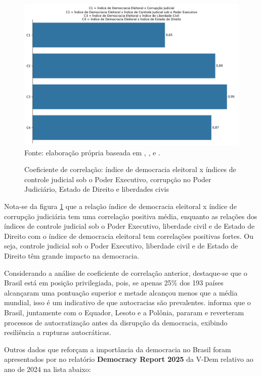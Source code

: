 \begin{figure}[H]
	\centering
	\caption{Coeficiente de correlação: índice de democracia eleitoral x índices de controle judicial sob o Poder Executivo, corrupção no Poder Judiciário, Estado de Direito e liberdades civis}
	\includegraphics[width=1\linewidth]{figuras/comparacao_democracia.png}
	\label{fig:comparacao_democracia}
	\footnotesize{Fonte: elaboração própria baseada em \cite{rule-of-law-index}, \cite{jus_constraints_on_gov}, \cite{judicial-corruption-score} e \cite{human-rights-index-vdem}.}
\end{figure}

Nota-se da figura \ref{fig:comparacao_democracia} que a relação índice de democracia eleitoral x índice de corrupção judiciária tem uma correlação positiva média, enquanto as relações dos índices de controle judicial sob o Poder Executivo, liberdade civil e de Estado de Direito com o índice de democracia eleitoral tem correlações positivas fortes. Ou seja, controle judicial sob o Poder Executivo, liberdade civil e de Estado de Direito têm grande impacto na democracia. 

Considerando a análise de coeficiente de correlação anterior, destaque-se que o Brasil está em posição privilegiada, pois, se apenas 25\% dos 193 países alcançaram uma pontuação superior e metade alcançou menos que a média mundial, isso é um indicativo de que autocracias são prevalentes. \cite{nord2025democracy} informa que o Brasil, juntamente com o Equador, Lesoto e a Polônia, pararam e reverteram processos de autocratização antes da disrupção da democracia, exibindo resiliência a rupturas autocráticas.

Outros dados que reforçam a importância da democracia no Brasil foram apresentados por \cite{nord2025democracy} no relatório \textbf{Democracy Report 2025} da V-Dem relativo ao ano de 2024 na lista abaixo:

